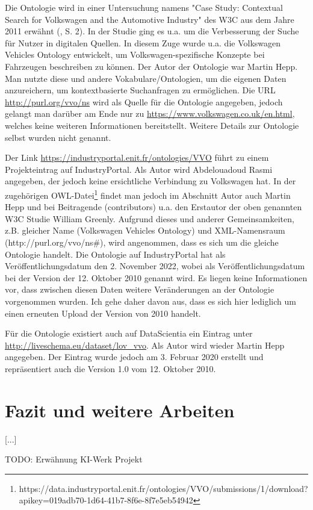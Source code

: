 \documentclass{article}
\begin{document}
Die Ontologie wird in einer Untersuchung namens "Case Study: Contextual Search for Volkswagen and the Automotive Industry" des W3C aus dem Jahre 2011 erwähnt (\cite{greenly2011case}, S. 2).
In der Studie ging es u.a. um die Verbesserung der Suche für Nutzer in digitalen Quellen.
In diesem Zuge wurde u.a. die Volkswagen Vehicles Ontology entwickelt, um Volkswagen-spezifische Konzepte bei Fahrzeugen beschreiben zu können.
Der Autor der Ontologie war Martin Hepp.
Man nutzte diese und andere Vokabulare/Ontologien, um die eigenen Daten anzureichern, um kontextbasierte Suchanfragen zu ermöglichen.
Die URL \url{http://purl.org/vvo/ns} wird als Quelle für die Ontologie angegeben, jedoch gelangt man darüber am Ende nur zu \url{https://www.volkswagen.co.uk/en.html}, welches keine weiteren Informationen bereitstellt.
Weitere Details zur Ontologie selbst wurden nicht genannt.

Der Link \url{https://industryportal.enit.fr/ontologies/VVO} führt zu einem Projekteintrag auf IndustryPortal.
Als Autor wird Abdelouadoud Rasmi angegeben, der jedoch keine ersichtliche Verbindung zu Volkswagen hat.
In der zugehörigen OWL-Datei\footnote{https://data.industryportal.enit.fr/ontologies/VVO/submissions/1/download?apikey=019adb70-1d64-41b7-8f6e-8f7e5eb54942} findet man jedoch im Abschnitt Autor auch Martin Hepp und bei Beitragende (contributors) u.a. den Erstautor der oben genannten W3C Studie William Greenly.
Aufgrund dieses und anderer Gemeinsamkeiten, z.B. gleicher Name (Volkswagen Vehicles Ontology) und XML-Namensraum (http://purl.org/vvo/ns\#), wird angenommen, dass es sich um die gleiche Ontologie handelt. Die Ontologie auf IndustryPortal hat als Veröffentlichungsdatum den 2. November 2022, wobei als Veröffentlichungsdatum bei der Version der 12. Oktober 2010 genannt wird.
Es liegen keine Informationen vor, dass zwischen diesen Daten weitere Veränderungen an der Ontologie vorgenommen wurden.
Ich gehe daher davon aus, dass es sich hier lediglich um einen erneuten Upload der Version von 2010 handelt.

Für die Ontologie existiert auch auf DataScientia ein Eintrag unter \url{http://liveschema.eu/dataset/lov\_vvo}.
Als Autor wird wieder Martin Hepp angegeben.
Der Eintrag wurde jedoch am 3. Februar 2020 erstellt und repräsentiert auch die Version 1.0 vom 12. Oktober 2010.


\section{Fazit und weitere Arbeiten}

[...]

TODO: Erwähnung KI-Werk Projekt



\medskip

\printbibliography
\end{document}
